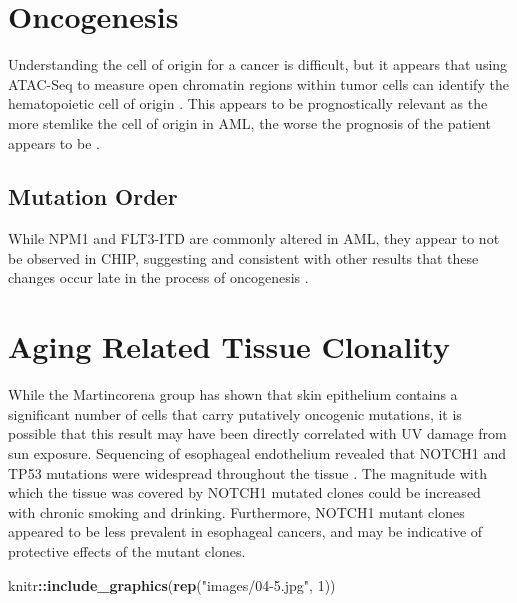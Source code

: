 \documentclass[]{book}
\newenvironment{Shaded}{\begin{snugshade}}{\end{snugshade}}
\newcommand{\DecValTok}[1]{\textcolor[rgb]{0.00,0.00,0.81}{#1}}
\newcommand{\KeywordTok}[1]{\textcolor[rgb]{0.13,0.29,0.53}{\textbf{#1}}}
\newcommand{\NormalTok}[1]{#1}
\newcommand{\OperatorTok}[1]{\textcolor[rgb]{0.81,0.36,0.00}{\textbf{#1}}}
\newcommand{\StringTok}[1]{\textcolor[rgb]{0.31,0.60,0.02}{#1}}
\begin{document}
\hypertarget{oncogenesis}{%
\section{Oncogenesis}\label{oncogenesis}}

Understanding the cell of origin for a cancer is difficult, but it appears that using ATAC-Seq to measure open chromatin regions within tumor cells can identify the hematopoietic cell of origin \citep{george2016leukaemia}. This appears to be prognostically relevant as the more stemlike the cell of origin in AML, the worse the prognosis of the patient appears to be \citep{young2016open}.

\hypertarget{mutation-order}{%
\subsection{Mutation Order}\label{mutation-order}}

While NPM1 and FLT3-ITD are commonly altered in AML, they appear to not be observed in CHIP, suggesting and consistent with other results that these changes occur late in the process of oncogenesis \citep{mckerrell2015leukemia, kronke2013clonal, abelson2018prediction}.

\hypertarget{aging-related-tissue-clonality}{%
\section{Aging Related Tissue Clonality}\label{aging-related-tissue-clonality}}

While the Martincorena group has shown that skin epithelium contains a significant number of cells that carry putatively oncogenic mutations, it is possible that this result may have been directly correlated with UV damage from sun exposure. Sequencing of esophageal endothelium revealed that NOTCH1 and TP53 mutations were widespread throughout the tissue \citep{yokoyama2019age, martincorena2018somatic}. The magnitude with which the tissue was covered by NOTCH1 mutated clones could be increased with chronic smoking and drinking. Furthermore, NOTCH1 mutant clones appeared to be less prevalent in esophageal cancers, and may be indicative of protective effects of the mutant clones.

\begin{Shaded}
\begin{Highlighting}[]
\NormalTok{knitr}\OperatorTok{::}\KeywordTok{include_graphics}\NormalTok{(}\KeywordTok{rep}\NormalTok{(}\StringTok{"images/04-5.jpg"}\NormalTok{, }\DecValTok{1}\NormalTok{))}
\end{Highlighting}
\end{Shaded}
\end{document}
